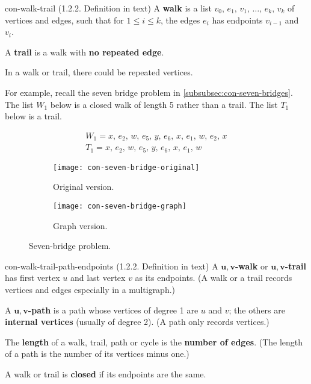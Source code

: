 \documentclass[../src/handouts/main.tex]{subfiles}
\begin{document}
\begin{definition}{}{con-walk-trail}
  (1.2.2. Definition in text)
  A \textbf{walk} is a list $v_0,\, e_1,\, v_1,\, \ldots,\, e_k,\, v_k$ of vertices and edges, such that for $1 \leq i \leq k$, the edges $e_i$ has endpoints $v_{i-1}$ and $v_i$.

  A \textbf{trail} is a walk with \textbf{no repeated edge}.
\end{definition}

In a walk or trail, there could be repeated vertices.

For example, recall the seven bridge problem in \cref{subsubsec:con-seven-bridges}. The list $W_1$ below is a closed walk of length 5 rather than a trail. The list $T_1$ below is a trail.

\begin{align*}
  W_1 = x,\, e_2,\, w,\, e_5,\, y,\, e_6,\, x,\, e_1,\, w,\, e_2,\, x \\
  T_1 = x,\, e_2,\, w,\, e_5,\, y,\, e_6,\, x,\, e_1,\, w
\end{align*}

\begin{figure}[htbp]
  \centering
  \begin{subfigure}{0.35\textwidth}
    \centering
    \texttt{[image: con-seven-bridge-original]}
    \caption{Original version.}
  \end{subfigure}
  \hfil
  \begin{subfigure}{0.25\textwidth}
    \centering
    \texttt{[image: con-seven-bridge-graph]}
    \caption{Graph version.}
  \end{subfigure}
  \caption{Seven-bridge problem.}
\end{figure}

\begin{definition}{}{con-walk-trail-path-endpoints}
  (1.2.2. Definition in text)
  A \textbf{$\bm{u,v}$-walk} or \textbf{$\bm{u,v}$-trail} has first vertex $u$ and last vertex $v$ as its endpoints.
  (A walk or a trail records vertices and edges especially in a multigraph.)

  A \textbf{$\bm{u,v}$-path} is a path whose vertices of degree 1 are $u$ and $v$; the others are \textbf{internal vertices} (usually of degree 2). (A path only records vertices.)

  The \textbf{length} of a walk, trail, path or cycle is the \textbf{number of edges}. (The length of a path is the number of its vertices minus one.)

  A walk or trail is \textbf{closed} if its endpoints are the same.
\end{definition}
\end{document}
